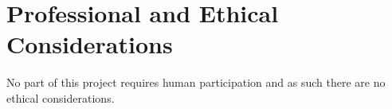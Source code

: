\chapter{Professional and Ethical Considerations}\label{sec:ethics}
No part of this project requires human participation and as such there are no
ethical considerations. 

